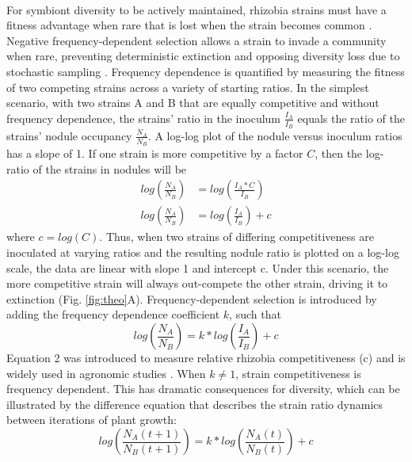 \documentclass[12pt]{article}
\begin{document}
\begin{doublespace}
\paragraph{}
For symbiont diversity to be actively maintained, rhizobia strains must have a fitness advantage when rare that is lost when the strain becomes common \cite{Chesson2000}. Negative frequency-dependent selection allows a strain to invade a community when rare, preventing deterministic extinction and opposing diversity loss due to stochastic sampling \cite{Provorov2000}. Frequency dependence is quantified by measuring the fitness of two competing strains across a variety of starting ratios. In the simplest scenario, with two strains A and B that are equally competitive and without frequency dependence, the strains’ ratio in the inoculum $\frac{I_A}{I_B}$ equals the ratio of the strains’ nodule occupancy $\frac{N_A}{N_B}$. A log-log plot of the nodule versus inoculum ratios has a slope of 1. If one strain is more competitive by a factor $C$, then the log-ratio of the strains in nodules will be 
\begin{align}
log\left(\frac{N_A}{N_B}\right) &= log\left(\frac{I_A*C}{I_B}\right)\tag{1a}\\
log\left(\frac{N_A}{N_B}\right) &= log\left(\frac{I_A}{I_B}\right) + c\tag{1b}
\end{align}
where $c = log(C)$. Thus, when two strains of differing competitiveness are inoculated at varying ratios and the resulting nodule ratio is plotted on a log-log scale, the data are linear with slope 1 and intercept c. Under this scenario, the more competitive strain will always out-compete the other strain, driving it to extinction (Fig. \ref{fig:theo}A).  Frequency-dependent selection is introduced by adding the frequency dependence coefficient $k$, such that 
\begin{equation}
log\left(\frac{N_A}{N_B}\right) = k*log\left(\frac{I_A}{I_B}\right) + c\tag{2}
\end{equation}
Equation 2 was introduced to measure relative rhizobia competitiveness (c) and is widely used in agronomic studies \cite{Amarger1982}. When $k\neq1$, strain competitiveness is frequency dependent. This has dramatic consequences for diversity, which can be illustrated by the difference equation that describes the strain ratio dynamics between iterations of plant growth: 
\begin{equation}
log\left(\frac{N_A(t+1)}{N_B(t+1)}\right)=k*log\left(\frac{N_A(t)}{N_B(t)}\right)+c\tag{3}
\end{equation}

\end{doublespace}
\end{document}
